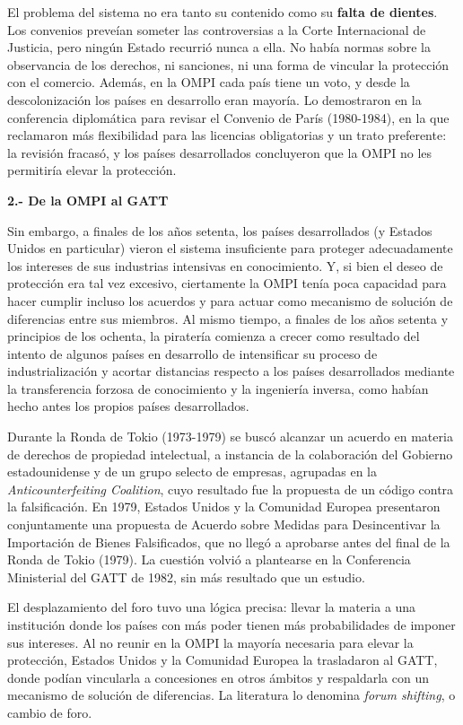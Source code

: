 \documentclass[10pt,a4paper]{article}
\begin{document}
El problema del sistema no era tanto su contenido como su \textbf{falta de dientes}. Los convenios preveían someter las controversias a la Corte Internacional de Justicia, pero ningún Estado recurrió nunca a ella. No había normas sobre la observancia de los derechos, ni sanciones, ni una forma de vincular la protección con el comercio. Además, en la OMPI cada país tiene un voto, y desde la descolonización los países en desarrollo eran mayoría. Lo demostraron en la conferencia diplomática para revisar el Convenio de París (1980-1984), en la que reclamaron más flexibilidad para las licencias obligatorias y un trato preferente: la revisión fracasó, y los países desarrollados concluyeron que la OMPI no les permitiría elevar la protección.

\textbf{2.- De la OMPI al GATT}

Sin embargo, a finales de los años setenta, los países desarrollados (y Estados Unidos en particular) vieron el sistema insuficiente para proteger adecuadamente los intereses de sus industrias intensivas en conocimiento. Y, si bien el deseo de protección era tal vez excesivo, ciertamente la OMPI tenía poca capacidad para hacer cumplir incluso los acuerdos y para actuar como mecanismo de solución de diferencias entre sus miembros. Al mismo tiempo, a finales de los años setenta y principios de los ochenta, la piratería comienza a crecer como resultado del intento de algunos países en desarrollo de intensificar su proceso de industrialización y acortar distancias respecto a los países desarrollados mediante la transferencia forzosa de conocimiento y la ingeniería inversa, como habían hecho antes los propios países desarrollados.

Durante la Ronda de Tokio (1973-1979) se buscó alcanzar un acuerdo en materia de derechos de propiedad intelectual, a instancia de la colaboración del Gobierno estadounidense y de un grupo selecto de empresas, agrupadas en la \textit{Anticounterfeiting Coalition}, cuyo resultado fue la propuesta de un código contra la falsificación. En 1979, Estados Unidos y la Comunidad Europea presentaron conjuntamente una propuesta de Acuerdo sobre Medidas para Desincentivar la Importación de Bienes Falsificados, que no llegó a aprobarse antes del final de la Ronda de Tokio (1979). La cuestión volvió a plantearse en la Conferencia Ministerial del GATT de 1982, sin más resultado que un estudio.

El desplazamiento del foro tuvo una lógica precisa: llevar la materia a una institución donde los países con más poder tienen más probabilidades de imponer sus intereses. Al no reunir en la OMPI la mayoría necesaria para elevar la protección, Estados Unidos y la Comunidad Europea la trasladaron al GATT, donde podían vincularla a concesiones en otros ámbitos y respaldarla con un mecanismo de solución de diferencias. La literatura lo denomina \textit{forum shifting}, o cambio de foro.
\end{document}
